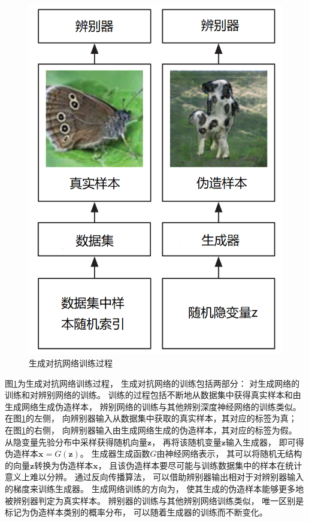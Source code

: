 \begin{figure}[ht]
    \centering
    \includegraphics[height=0.5\textheight]{figures/gan_training}
    \caption{生成对抗网络训练过程}\label{fig:gan_training}
\end{figure}

图{\ref{fig:gan_training}}为生成对抗网络训练过程，
生成对抗网络的训练包括两部分：
对生成网络的训练和对辨别网络的训练。
训练的过程包括不断地从数据集中获得真实样本和由生成网络生成伪造样本，
辨别网络的训练与其他辨别深度神经网络的训练类似。
在图{\ref{fig:gan_training}}的左侧，
向辨别器输入从数据集中获取的真实样本，其对应的标签为真；
在图{\ref{fig:gan_training}}的右侧，
向辨别器输入由生成网络生成的伪造样本，其对应的标签为假。
从隐变量先验分布中采样获得随机向量{$\bm{z}$}，
再将该随机变量{$\bm{z}$}输入生成器，
即可得伪造样本{$\bm{x}=G(\bm{z})$}。
生成器生成函数{$G$}由神经网络表示，
其可以将随机无结构的向量{$\bm{z}$}转换为伪造样本{$\bm{x}$}，
且该伪造样本要尽可能与训练数据集中的样本在统计意义上难以分辨。
通过反向传播算法，
可以借助辨别器输出相对于对辨别器输入的梯度来训练生成器。
生成网络训练的方向为，
使其生成的伪造样本能够更多地被辨别器判定为真实样本。
辨别器的训练与其他辨别网络训练类似，
唯一区别是标记为伪造样本类别的概率分布，
可以随着生成器的训练而不断变化。








